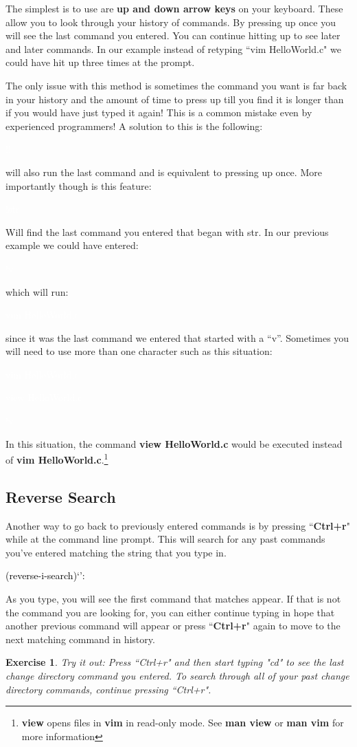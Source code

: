\documentclass[oneside]{book}
\newcommand{\commandline}[1]{\begin{center} \colorbox{Dark}{\textcolor{white}{#1}} \end{center}}
\newcommand{\exampleout}[1]{\begin{center} \colorbox{Light}{\textcolor{black}{#1}} \end{center}}
\newtheorem{ex}{Exercise}[chapter]
\begin{document}
The simplest is to use are \textbf{up and down arrow keys} on your keyboard. These allow you to look through your history of commands. By pressing up once you will see the last command you entered. You can continue hitting up to see later and later commands. In our example instead of retyping ``vim HelloWorld.c" we could have hit up three times at the prompt. 

The only issue with this method is sometimes the command you want is far back in your history and the amount of time to press up till you find it is longer than if you would have just typed it again! This is a common mistake even by experienced programmers! A solution to this is the following:
\commandline{!!}
will also run the last command and is equivalent to pressing up once. More importantly though is this feature:
\commandline{!str}
Will find the last command you entered that began with str. In our previous example we could have entered:
\commandline{!v}
which will run:
\commandline{vim HelloWorld.c}
since it was the last command we entered that started with a ``v''. Sometimes you will need to use more than one character such as this situation:
\commandline{vim HelloWorld.c}
\commandline{view HelloWorld.c}
\commandline{!v}

In this situation, the command \textbf{view HelloWorld.c} would be executed instead of \textbf{vim HelloWorld.c}.\footnote{\textbf{view} opens files in \textbf{vim} in read-only mode. See \textbf{man view} or \textbf{man vim} for more information}

\subsection{Reverse Search}
Another way to go back to previously entered commands is by pressing ``\textbf{Ctrl+r}" while at the command line prompt.  This will search for any past commands you've entered matching the string that you type in.
\exampleout{(reverse-i-search)`':}
As you type, you will see the first command that matches appear.  If that is not the command you are looking for, you can either continue typing in hope that another previous command will appear or press ``\textbf{Ctrl+r}" again to move to the next matching command in history.

\vspace{0.5cm}

\begin{ex}
Try it out: Press ``Ctrl+r" and then start typing "cd" to see the last change directory command you entered. To search through all of your past change directory commands, continue pressing ``Ctrl+r". 
\end{ex}
\end{document}

